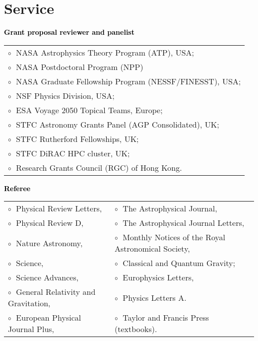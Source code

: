 \documentclass[a4paper]{moderncv}
\begin{document}
\section{Service}

 \textbf{\textcolor{black}{Grant proposal reviewer and panelist}}\vspace{0.1cm}\\
\begin{tabular}{@{\hskip 0.4cm}l}
$\circ\;$ NASA Astrophysics Theory Program (ATP), USA; \\
$\circ\;$ NASA Postdoctoral Program (NPP)\\
$\circ\;$ NASA Graduate Fellowship Program (NESSF/FINESST), USA; \\
$\circ\;$ NSF Physics Division, USA;
\\
$\circ\;$ ESA Voyage 2050 Topical Teams, Europe;
 \\
$\circ\;$ STFC Astronomy Grants Panel (AGP Consolidated), UK;
\\
$\circ\;$ STFC Rutherford Fellowships, UK;
\\
$\circ\;$ STFC DiRAC HPC cluster, UK;
\\
$\circ\;$ Research Grants Council (RGC) of Hong Kong.
\end{tabular}
\vspace{0.2cm}



\textbf{\textcolor{black}{Referee}}\vspace{0.1cm}\\
\begin{tabular}{@{\hskip 0.4cm}l@{\hskip 0.4in}l}
$\circ\;$ Physical Review Letters, & $\circ\;$ The Astrophysical Journal,   \\
$\circ\;$ Physical Review D, & $\circ\;$ The Astrophysical Journal  Letters,  \\
$\circ\;$ Nature Astronomy,  & $\circ\;$ Monthly Notices of the Royal Astronomical Society, \\
$\circ\;$ Science,  & $\circ\;$ Classical and Quantum Gravity; \\
$\circ\;$ Science Advances, & $\circ\;$  Europhysics Letters, \\
$\circ\;$ General Relativity and Gravitation, &  $\circ\;$ Physics Letters A. \\
$\circ\;$ European Physical Journal Plus,  &  $\circ\;$ Taylor and Francis Press (textbooks).
\end{tabular}
\vspace{0.2cm}
 
\end{document}
